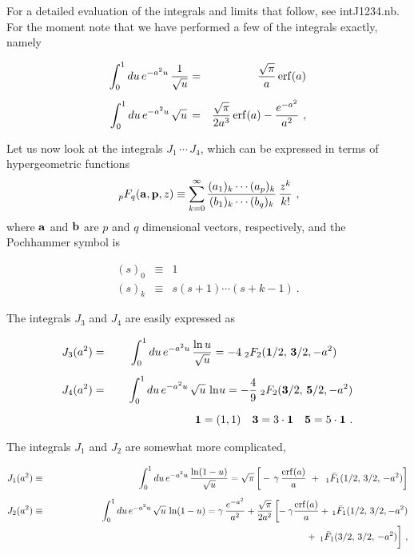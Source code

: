 \documentclass[preprint,12pt,eqsecnum,nofootinbib,amsmath,amssymb]{revtex4}
\begin{document}
\noindent
For a detailed evaluation of the integrals and limits
that follow, see intJ1234.nb. For the moment note that
we have performed a few of the integrals exactly, namely
\begin{mathletters}
\begin{eqnarray}
  \int_0^1 du\,e^{-a^2 u}\,\frac{1}{\sqrt{u}} 
  &=& \frac{\sqrt{\pi}}{a}\,{\rm erf}(a)
\\[5pt]
  \int_0^1 du\,e^{-a^2 u} \,\sqrt{u} \, 
  &=&
  \frac{{\sqrt \pi}}{2 a^3}\,{\rm erf}(a) -
  \frac{e^{-a^2}}{a^2} \ ,
\end{eqnarray}
\end{mathletters}

Let us now look at the integrals $J_1 \, \cdots \, J_4$,
which can be expressed in terms of hypergeometric functions
\begin{eqnarray}
  \phantom{.}_p F_q({\bf a}, {\bf p},z)
  \equiv
  \sum_{k=0}^\infty \frac{(a_1)_k \cdots 
  (a_p)_k} {(b_1)_k \cdots (b_q)_k}\,
  \frac{z^k}{k!} \ ,
\end{eqnarray}
where ${\bf a}$ and ${\bf b}$ are $p$ and $q$ dimensional 
vectors, respectively, and the Pochhammer symbol is
\begin{mathletters}
\begin{eqnarray}
 (s)_0 &\equiv& 1
\\
 (s)_k &\equiv& s(s+1) \cdots (s+k-1) \ .
\end{eqnarray}
\end{mathletters}
The integrals $J_3$ and $J_4$ are easily expressed
as
\begin{mathletters}
\begin{eqnarray}
  J_3(a^2) &=&
  \int_0^1 du\,e^{-a^2 u} \, \frac{\ln u} {\sqrt{u}} 
  =
  -4 \phantom{.}_2 F_2({\bf 1}/2,\,{\bf 3}/2,- a^2)
  \hskip0.5cm  
\\[5pt]
  J_4(a^2) &=&
  \int_0^1 du\,e^{-a^2 u} \, \sqrt{u}\, 
  \ln \hskip-0.05cm u 
  =
  -\frac{4}{9} \phantom{.}_2 F_2({\bf 3}/2,\,{\bf 5}/2,- a^2) 
\\[5pt] \nonumber
&& \hskip2.5cm 
   {\bf 1}=(1,1) ~~~ {\bf 3} = 3 \cdot {\bf 1} ~~~
   {\bf 5} = 5 \cdot {\bf 1} \ .
\end{eqnarray}
\end{mathletters}
The integrals $J_1$ and $J_2$ are somewhat more complicated,
\begin{mathletters}
\begin{eqnarray}
  J_1(a^2) &\equiv&
  \int_0^1 du\,e^{-a^2 u} \, \frac{\ln(1-u)}
  {\sqrt{u}} 
  =
  \sqrt{\pi}\, \bigg[
  -\,\gamma \, \frac{{\rm erf}(a)}{a} ~+~
  \,_1\bar F_1(1/2,\,3/2,\,-a^2)
  \bigg]
\\[5pt]
  J_2(a^2) &\equiv&
  \int_0^1 du\,e^{-a^2 u} \, \sqrt{u}\, 
  \ln(1-u)
  = \gamma \, \frac{e^{-a^2}}{a^2} +
  \frac{\sqrt{\pi}}{2a^2}\,
  \bigg[\hskip-0.1cm 
  -\gamma \frac{{\rm erf}(a)}{a} +
  \,_1\bar F_1(1/2,\,3/2,-a^2)
\\\nonumber && \hskip9.65cm 
  +~ \,_1\bar F_1(3/2,\,3/2,\,-a^2)
  \bigg] \ ,
\end{eqnarray}
\end{mathletters}
\end{document}
